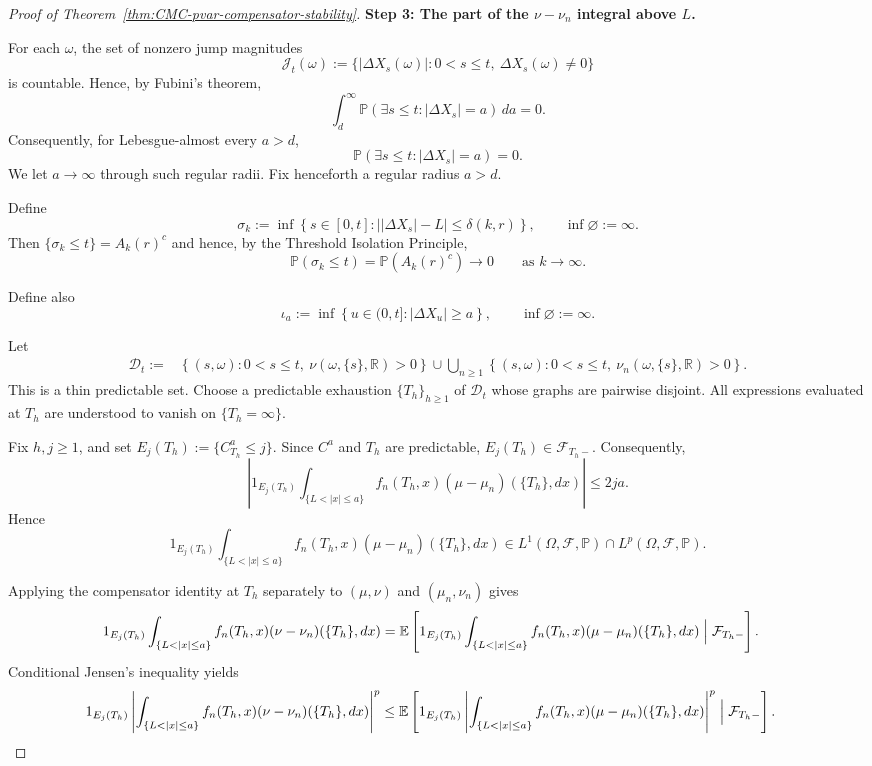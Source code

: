 \documentclass[a4paper,10pt]{article}
\newcommand{\E}{\mathbb E}
\renewcommand{\P}{\mathbb P}
\begin{document}
\begin{proof}[Proof of Theorem~\ref{thm:CMC-pvar-compensator-stability}]
\medskip
\noindent
\textbf{Step 3: The part of the \(\nu-\nu_n\) integral above \(L\).}
\medskip

For each \(\omega\), the set of nonzero jump magnitudes
\[
\mathcal J_t(\omega)
:=
\{|\Delta X_s(\omega)|:0<s\le t,\ \Delta X_s(\omega)\ne0\}
\]
is countable. Hence, by Fubini's theorem,
\[
\int_d^\infty
\P\left(
\exists s\le t:|\Delta X_s|=a
\right)\,da
=
0.
\]
Consequently, for Lebesgue-almost every \(a>d\),
\[
\P\left(
\exists s\le t:|\Delta X_s|=a
\right)=0.
\]
We let \(a\to\infty\) through such regular radii. Fix henceforth a
regular radius \(a>d\).

Define
\[
\sigma_k
:=
\inf\left\{
s\in[0,t]:
\bigl||\Delta X_s|-L\bigr|\le\delta(k,r)
\right\},
\qquad
\inf\varnothing:=\infty.
\]
Then
$
        \{\sigma_k\le t\}=A_k(r)^c
$
and hence, by the Threshold Isolation Principle,
\[
        \P(\sigma_k\le t)
        =
        \P(A_k(r)^c)
        \longrightarrow0
        \qquad\text{as }k\to\infty.
\]

Define also
\[
\iota_a
:=
\inf\left\{
u\in(0,t]:
|\Delta X_u|\ge a
\right\},
\qquad
\inf\varnothing:=\infty.
\]

Let
\[
\begin{aligned}
\mathcal D_t
:={}&
\left\{
(s,\omega):
0<s\le t,\
\nu(\omega,\{s\},\mathbb R)>0
\right\}
\cup
\bigcup_{n\ge1}
\left\{
(s,\omega):
0<s\le t,\
\nu_n(\omega,\{s\},\mathbb R)>0
\right\}.
\end{aligned}
\]
This is a thin predictable set. Choose a predictable exhaustion
$
        \{T_h\}_{h\ge1}
$
of \(\mathcal D_t\) whose graphs are pairwise disjoint. All expressions
evaluated at \(T_h\) are understood to vanish on \(\{T_h=\infty\}\).

Fix \(h,j\ge1\), and set
$
        E_j(T_h):=\{C^a_{T_h}\le j\}.
$
Since \(C^a\) and \(T_h\) are predictable,
$
        E_j(T_h)\in\mathcal F_{T_h-}.
$
Consequently,
\[
\left|
1_{E_j(T_h)}
\int_{\{L<|x|\le a\}}
f_n(T_h,x)(\mu-\mu_n)(\{T_h\},dx)
\right|
\le 2ja.
\]
Hence
\[
1_{E_j(T_h)}
\int_{\{L<|x|\le a\}}
f_n(T_h,x)(\mu-\mu_n)(\{T_h\},dx)
\in
L^1(\Omega,\mathcal F,\P)
\cap
L^p(\Omega,\mathcal F,\P).
\]

Applying the compensator identity at \(T_h\) separately to
\((\mu,\nu)\) and \((\mu_n,\nu_n)\) gives
\begin{align}
&1_{E_j(T_h)}
\int_{\{L<|x|\le a\}}
f_n(T_h,x)(\nu-\nu_n)(\{T_h\},dx)
=
\E\left[
1_{E_j(T_h)}
\int_{\{L<|x|\le a\}}
f_n(T_h,x)(\mu-\mu_n)(\{T_h\},dx)
\Bigm|\mathcal F_{T_h-}
\right].
\label{eq:pvar-localized-annulus-identity}
\end{align}
Conditional Jensen's inequality yields
\begin{align}
&1_{E_j(T_h)}
\left|
\int_{\{L<|x|\le a\}}
f_n(T_h,x)(\nu-\nu_n)(\{T_h\},dx)
\right|^p
\le
\E\left[
1_{E_j(T_h)}
\left|
\int_{\{L<|x|\le a\}}
f_n(T_h,x)(\mu-\mu_n)(\{T_h\},dx)
\right|^p
\Bigm|\mathcal F_{T_h-}
\right].
\label{eq:pvar-localized-annulus-Jensen}
\end{align}


\end{proof}
\end{document}
